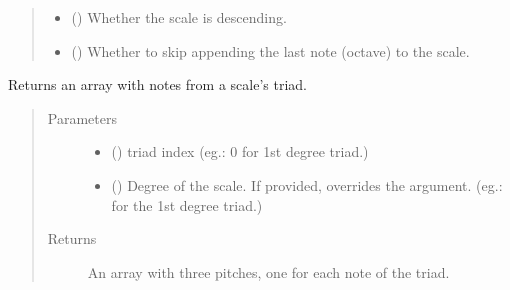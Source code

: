 \documentclass[letterpaper,10pt,english]{sphinxmanual}
\begin{document}
\begin{fulllineitems}
\begin{fulllineitems}
\begin{quote}
\begin{description}
\begin{itemize}
\item {} 
 () \textendash{} Whether the scale is descending.

\item {} 
 () \textendash{} Whether to skip appending the last
note (octave) to the scale.

\end{itemize}

\end{description}\end{quote}

\end{fulllineitems}


\begin{fulllineitems}
\label{\detokenize{index:birdears.scale.DiatonicScale.get_triad}}
Returns an array with notes from a scale’s triad.
\begin{quote}\begin{description}
\item[{Parameters}] \leavevmode\begin{itemize}
\item {} 
 () \textendash{} triad index (eg.: 0 for 1st degree triad.)

\item {} 
 () \textendash{} Degree of the scale. If provided, overrides the
 argument. (eg.:  for the 1st degree triad.)

\end{itemize}

\item[{Returns}] \leavevmode
An array with three pitches, one for each note of the triad.

\end{description}\end{quote}

\end{fulllineitems}


\end{fulllineitems}

\end{document}
